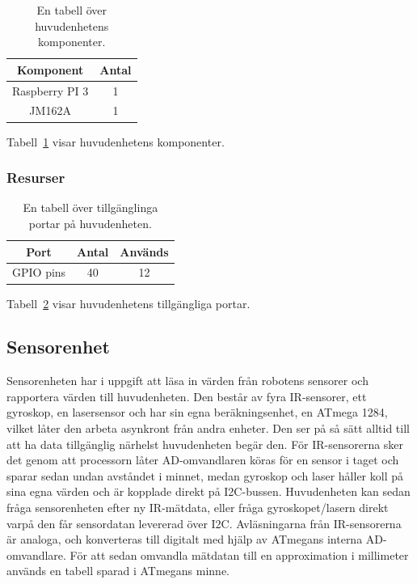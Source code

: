 \documentclass{article}
\begin{document}
\begin{table}[H]
\centering
\caption{En tabell över huvudenhetens komponenter.}
\begin{tabular}{ | c | c | }
\hline
\textbf{Komponent} & \textbf{Antal} \\
\hline
Raspberry PI 3 & 1 \\
\hline
JM162A & 1 \\
\hline
\end{tabular}
\label{table:huvud_komp}
\end{table}

Tabell~\ref{table:huvud_komp} visar huvudenhetens komponenter.

\subsubsection{Resurser}

\begin{table}[H]
\centering
\caption{En tabell över tillgänglinga portar på huvudenheten.}
\begin{tabular}{ | c | c | c | }
\hline
\textbf{Port} & \textbf{Antal} & \textbf{Används} \\
\hline
GPIO pins & 40 & 12 \\
\hline
\end{tabular}
\label{table:huvud_resurser}
\end{table}

Tabell~\ref{table:huvud_resurser} visar huvudenhetens tillgängliga portar.

\subsection{Sensorenhet}
Sensorenheten har i uppgift att läsa in värden från robotens sensorer och rapportera värden till huvudenheten. Den består av fyra IR-sensorer, ett gyroskop, en lasersensor och har sin egna beräkningsenhet, en ATmega 1284, vilket låter den arbeta asynkront från andra enheter. Den ser på så sätt alltid till att ha data tillgänglig närhelst huvudenheten begär den. För IR-sensorerna sker det genom att processorn låter AD-omvandlaren köras för en sensor i taget och sparar sedan undan avståndet i minnet, medan gyroskop och laser håller koll på sina egna värden och är kopplade direkt på I2C-bussen. Huvudenheten kan sedan fråga sensorenheten efter ny IR-mätdata, eller fråga gyroskopet/lasern direkt varpå den får sensordatan levererad över I2C.
\newline\newline
Avläsningarna från IR-sensorerna är analoga, och konverteras till digitalt med hjälp av ATmegans interna AD-omvandlare. För att sedan omvandla mätdatan till en approximation i millimeter används en tabell sparad i ATmegans minne.
\end{document}
